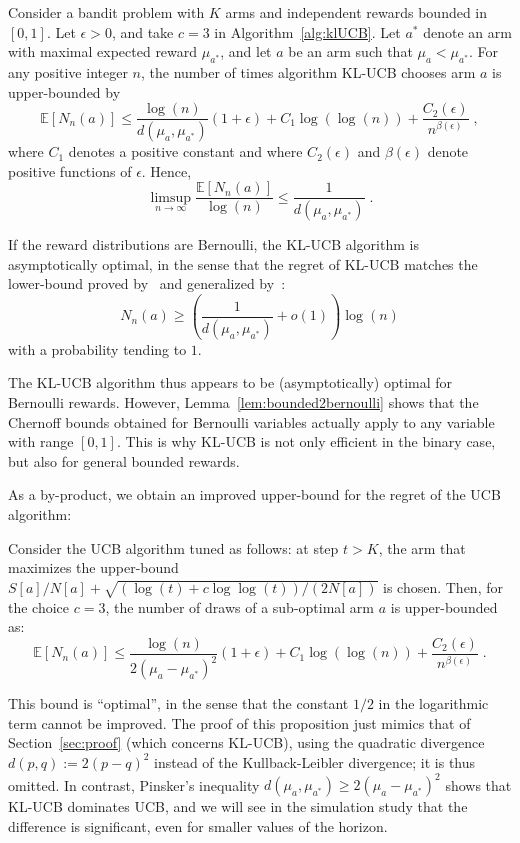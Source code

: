 \documentclass[wcp]{jmlr}
\newcommand{\E}{\mathbb{E}}
\newcommand{\1}{\mathbbm{1}}
\begin{document}
\begin{theorem}\label{th:borneNbplayed}
  Consider a bandit problem with $K$ arms and independent rewards  bounded in
  $[0,1]$. Let $\epsilon>0$, and take $c=3$ in Algorithm~\ref{alg:klUCB}.  Let $a^*$
  denote an arm with maximal expected reward $\mu_{a^*}$, and let $a$ be an arm
  such that $\mu_a < \mu_{a^*}$.  For any positive integer $n$, the number of
  times algorithm KL-UCB chooses arm $a$ is upper-bounded by
  \[\E[N_n(a)] \leq \frac{\log(n)}{d(\mu_a, \mu_{a^*})}(1+\epsilon) + C_1
  \log(\log(n)) + \frac{C_2(\epsilon)}{n^{\beta(\epsilon)}}\;,\] where $C_1$
  denotes a positive constant and where $C_2(\epsilon)$ and $\beta(\epsilon)$
  denote positive functions of $\epsilon$. Hence,
  \[\limsup_{n\to\infty} \frac{\E[N_n(a)]}{\log(n)} \leq \frac{1}{d(\mu_a,
    \mu_{a^*})}\;.\]
\end{theorem}

\begin{corollary}
  If the reward distributions are Bernoulli, the KL-UCB algorithm is
  asymptotically optimal, in the sense that the regret of KL-UCB matches the
  lower-bound proved by~\cite{LaiRobbins85bandits} and generalized
  by~\cite{BurnetasKatehakis97bandits}:
  \[N_n(a) \geq \left( \frac{1}{d(\mu_a, \mu_{a^*})} + o(1) \right)\log(n)\] with a
  probability tending to $1$.
\end{corollary}

The KL-UCB algorithm thus appears to be (asymptotically) optimal for Bernoulli rewards. However, Lemma~\ref{lem:bounded2bernoulli} shows that the Chernoff bounds obtained for Bernoulli variables actually apply to any variable with range $[0,1]$. This is why 
KL-UCB is not only efficient in the binary case, but also for general bounded rewards.

As a by-product, we obtain an improved upper-bound for the regret of the  UCB algorithm:
\begin{proposition}\label{prop:betterUCB}
Consider the UCB algorithm tuned as follows: at step $t>K$, the arm that maximizes the upper-bound $S[a]/N[a] + \sqrt{(\log(t)+c\log\log(t))/(2 N[a])}$ is chosen. 
Then, for the choice $c=3$, the number of draws of a sub-optimal arm $a$ is upper-bounded as:
  \begin{equation}\label{eq:UCBmeilleureborne}
   \E[N_n(a)] \leq \frac{\log(n)}{2(\mu_a-\mu_{a^*})^2}(1+\epsilon) + C_1
  \log(\log(n)) + \frac{C_2(\epsilon)}{n^{\beta(\epsilon)}}\;.
\end{equation}
\end{proposition}
This bound is ``optimal'', in the sense that the constant $1/2$ in the logarithmic term cannot be improved. 
The proof of this proposition just mimics that of Section~\ref{sec:proof} (which concerns KL-UCB), using the quadratic divergence  $d(p,q):= 2(p-q)^2$ instead of the Kullback-Leibler divergence; it is thus omitted.
In contrast, Pinsker's inequality $d(\mu_a, \mu_{a^*})\geq 2(\mu_a-\mu_{a^*})^2$ shows that KL-UCB dominates UCB, and we will see in the simulation study that the difference is significant, even for smaller values of the horizon.
\end{document}
